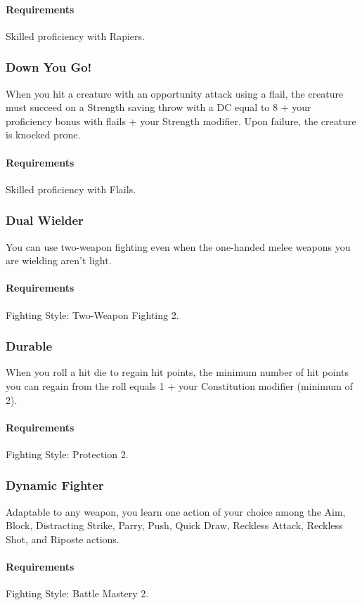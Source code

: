     \paragraph{Requirements} Skilled proficiency with Rapiers.
\subsubsection{Down You Go!} \label{feat::downyougo}
    When you hit a creature with an opportunity attack using a flail, the creature must succeed on a Strength saving throw with a DC equal to 8 + your proficiency bonus with flails + your Strength modifier.
    Upon failure, the creature is knocked prone.
    \paragraph{Requirements} Skilled proficiency with Flails.
\subsubsection{Dual Wielder} \label{feat::dualwielder}
    You can use two-weapon fighting even when the one-handed melee weapons you are wielding aren't light.
    \paragraph{Requirements} Fighting Style: Two-Weapon Fighting 2.
\subsubsection{Durable} \label{feat::durable}
    When you roll a hit die to regain hit points, the minimum number of hit points you can regain from the roll equals 1 + your Constitution modifier (minimum of 2).
    \paragraph{Requirements} Fighting Style: Protection 2.
\subsubsection{Dynamic Fighter} \label{feat::dynamicfighter}
    Adaptable to any weapon, you learn one action of your choice among the Aim, Block, Distracting Strike, Parry, Push, Quick Draw, Reckless Attack, Reckless Shot, and Riposte actions.
    \paragraph{Requirements} Fighting Style: Battle Mastery 2.
